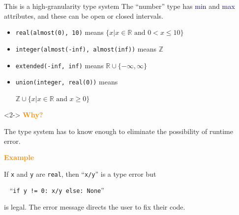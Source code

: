 \documentclass{beamer}
\begin{document}
\begin{frame}[fragile]{This is a high-granularity type system}
\vspace{0.5 cm}
The ``number'' type has \textcolor{darkblue}{min} and \textcolor{darkblue}{max} attributes, and these can be open or closed intervals.
\begin{itemize}
\item {\tt real(almost(0), 10)} means $\{x | x \in \mathbb{R}\mbox{ and } 0 < x \le 10\}$
\item {\tt integer(almost(-inf), almost(inf))} means $\mathbb{Z}$
\item {\tt extended(-inf, inf)} means $\mathbb{R} \cup \{-\infty, \infty\}$
\item {\tt union(integer, real(0))} means

\hfill $\mathbb{Z} \cup \{x | x \in \mathbb{R}\mbox{ and } x \ge 0\}$
\end{itemize}

\vfill
\begin{uncoverenv}<2->
\textcolor{darkorange}{\bf Why?}

The type system has to know enough to eliminate the possibility of runtime error.

\vspace{0.2 cm}
\textcolor{darkorange}{\bf Example}

If {\tt x} and {\tt y} are {\tt real}, then ``{\tt x/y}'' is a type error but

\vspace{0.2 cm}
\mbox{ } \hfill ``{\tt if y != 0:\ x/y else:\ None}'' \hfill \mbox{ }

\vspace{0.2 cm}
is legal. The error message directs the user to fix their code.
\end{uncoverenv}
\end{frame}
\end{document}
